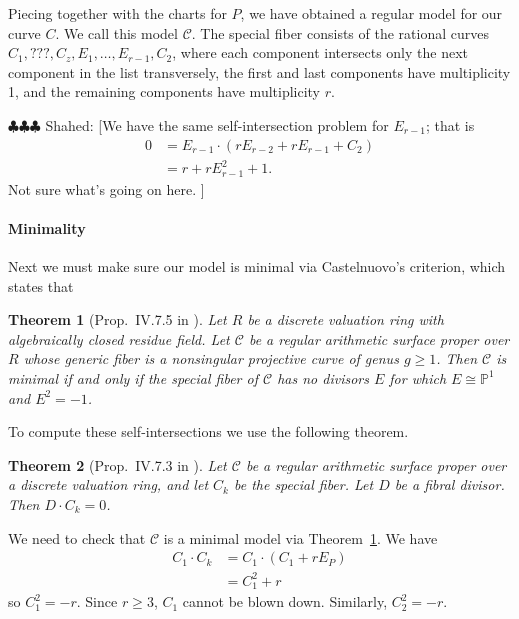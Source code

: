 \documentclass{article}
\newcommand{\shahed}[1]{{\color{Purple} \sf $\clubsuit\clubsuit\clubsuit$ Shahed: [#1]}}
\newcommand{\scd}{\mathscr{C}}
\theoremstyle{plain}
\newtheorem{theorem}{Theorem}[section]
\theoremstyle{definition}
\theoremstyle{remark}
\newcommand{\isom}{\cong}
\newcommand{\Pro}{\ensuremath{\mathbb{P}}}
\begin{document}
Piecing together with the charts for $P$, we have obtained a regular model for our curve $C$. We call this model $\scd$. The special fiber consists of the rational curves $C_1, ???, C_z, E_1, \dots, E_{r-1}, C_2$, where each component intersects only the next component in the list transversely, the first and last components have multiplicity 1, and the remaining components have multiplicity $r$.

\shahed{We have the same self-intersection problem for $E_{r-1}$; that is
  \begin{align*}
    0 &= E_{r-1} \cdot (rE_{r-2} + rE_{r-1} + C_2) \\
    &= r + r E_{r-1}^2 + 1.
  \end{align*}
  Not sure what's going on here.
  }


\paragraph{Minimality}
\label{sec:minimality}

Next we must make sure our model is minimal via Castelnuovo's criterion, which states that
\begin{theorem}[Prop.~IV.7.5 in \cite{silvermanATAEC}]\label{thm:castelnuovo}
  Let $R$ be a discrete valuation ring with algebraically closed residue field. Let $\scd$ be a regular arithmetic surface proper over $R$ whose generic fiber is a nonsingular projective curve of genus $g \geq 1$. Then $\scd$ is minimal if and only if the special fiber of $\scd$ has no divisors $E$ for which $E \isom \Pro^1$ and $E^2 = -1$.
\end{theorem}

To compute these self-intersections we use the following theorem.
\begin{theorem}[Prop.~IV.7.3 in \cite{silvermanATAEC}]\label{thm:fibral-intersect-total}
  Let $\scd$ be a regular arithmetic surface proper over a discrete valuation ring, and let $C_k$ be the special fiber. Let $D$ be a fibral divisor. Then $D \cdot C_k = 0$.
\end{theorem}

We need to check that $\scd$ is a minimal model via Theorem~\ref{thm:castelnuovo}. We have
\begin{align*}
  C_1 \cdot C_k &= C_1 \cdot (C_1 + rE_{P}) \\
  &= C_1^2 + r
\end{align*}
so $C_1^2 = -r$. Since $r \geq 3$, $C_1$ cannot be blown down. Similarly, $C_2^2 = -r$.
\end{document}
